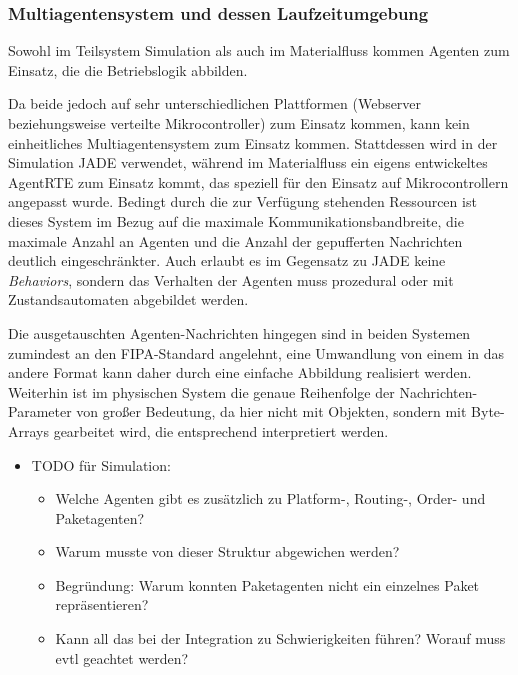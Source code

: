 \subsubsection{Multiagentensystem und dessen Laufzeitumgebung}
Sowohl im Teilsystem Simulation als auch im Materialfluss kommen Agenten zum Einsatz, die die Betriebslogik abbilden. 

Da beide jedoch auf sehr unterschiedlichen Plattformen (Webserver beziehungsweise verteilte Mikrocontroller) zum Einsatz kommen, kann kein einheitliches Multiagentensystem zum Einsatz kommen. Stattdessen wird in der Simulation JADE verwendet, während im Materialfluss ein eigens entwickeltes AgentRTE zum Einsatz kommt, das speziell für den Einsatz auf Mikrocontrollern angepasst wurde. Bedingt durch die zur Verfügung stehenden Ressourcen ist dieses System im Bezug auf die maximale Kommunikationsbandbreite, die maximale Anzahl an Agenten und die Anzahl der gepufferten Nachrichten deutlich eingeschränkter. Auch erlaubt es im Gegensatz zu JADE keine \textit{Behaviors}, sondern das Verhalten der Agenten muss prozedural oder mit Zustandsautomaten abgebildet werden.

Die ausgetauschten Agenten-Nachrichten hingegen sind in beiden Systemen zumindest an den FIPA-Standard angelehnt, eine Umwandlung von einem in das andere Format kann daher durch eine einfache Abbildung realisiert werden. Weiterhin ist im physischen System die genaue Reihenfolge der Nachrichten-Parameter von großer Bedeutung, da hier nicht mit Objekten, sondern mit Byte-Arrays gearbeitet wird, die entsprechend interpretiert werden.

\begin{itemize}
\item TODO für Simulation:
\begin{itemize}
\item Welche Agenten gibt es zusätzlich zu Platform-, Routing-, Order- und Paketagenten?
\item Warum musste von dieser Struktur abgewichen werden?
\item Begründung: Warum konnten Paketagenten nicht ein einzelnes Paket repräsentieren?
\item Kann all das bei der Integration zu Schwierigkeiten führen? Worauf muss evtl geachtet werden?
\end{itemize}
\end{itemize}